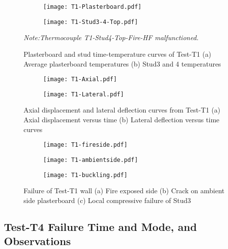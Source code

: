 \begin{figure}[!htbp]
	\centering
	\begin{subfigure}[b]{0.7\textwidth}
		\centering
		\texttt{[image: T1-Plasterboard.pdf]}
		\caption{}
		\label{subfig:T1-Plasterboard}
	\end{subfigure}
	\begin{subfigure}[b]{0.7\textwidth}
		\centering
		\texttt{[image: T1-Stud3-4-Top.pdf]}
		\caption{}
		\label{subfig:T1-Stud3-4-Top}
	\end{subfigure}
	   \caption{Plasterboard and stud time-temperature curves of Test-T1 (a) Average plasterboard temperatures (b) Stud3 and 4 temperatures}
	   \label{fig:T1-PB-Stud}
	   \fontsize{10}{1}\textit{Note:Thermocouple T1-Stud4-Top-Fire-HF malfunctioned.}
\end{figure}

\begin{figure}[!htbp]
	\centering
	\begin{subfigure}[b]{0.7\textwidth}
		\centering
		\texttt{[image: T1-Axial.pdf]}
		\caption{}
		\label{subfig:T1-Axial}
	\end{subfigure}
	\begin{subfigure}[b]{0.7\textwidth}
		\centering
		\texttt{[image: T1-Lateral.pdf]}
		\caption{}
		\label{subfig:T1-Lateral}
	\end{subfigure}
	   \caption{Axial displacement and lateral deflection curves from Test-T1 (a) Axial displacement versus time (b) Lateral deflection versus time curves}
	   \label{fig:T1-Axial-Lateral}
\end{figure}

\begin{figure}[!htbp]
	\centering
	\begin{subfigure}[b]{0.3\textwidth}
		\centering
		\texttt{[image: T1-fireside.pdf]}
		\caption{}
		\label{subfig:T1-fireside}
	\end{subfigure}
	\begin{subfigure}[b]{0.3\textwidth}
		\centering
		\texttt{[image: T1-ambientside.pdf]}
		\caption{}
		\label{subfig:T1-ambientside}
	\end{subfigure}
	\begin{subfigure}[b]{0.3\textwidth}
		\centering
		\texttt{[image: T1-buckling.pdf]}
		\caption{}
		\label{subfig:T1-buckling}
	\end{subfigure}
	   \caption{Failure of Test-T1 wall (a) Fire exposed side (b) Crack on ambient side plasterboard (c) Local compressive failure of Stud3}
	   \label{fig:T1-failure}
\end{figure}

\subsection{Test-T4 Failure Time and Mode, and Observations}